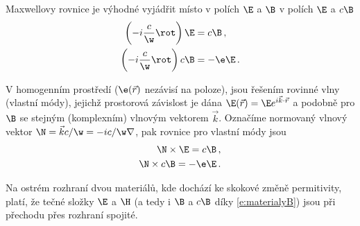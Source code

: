 Maxwellovy rovnice je výhodné vyjádřit místo v polích $\E$ a $\B$ v polích $\E$ a $c\B$
\begin{align}
\left(-i\frac{c}{\w}\rot\right) \E&=c\B \,, \label{e:rotE}\\
\left(-i\frac{c}{\w}\rot\right) c\B&=-\e \E \,. \label{e:rotB}
\end{align}

V homogenním prostředí ($\e(\vec{r})$ nezávisí na poloze), jsou řešením rovinné vlny (vlastní módy), jejichž prostorová závislost je dána $\E(\vec{r})=\E e^{i \vec{k}\cdot\vec{r}}$ a podobně pro $\B$ se stejným (komplexním) vlnovým vektorem $\vec{k}$.
Označíme normovaný vlnový vektor $\N=\vec{k} c/\w=-ic/\w\nabla$, pak rovnice pro vlastní módy jsou
\begin{align}
\N \times \E = c\B \,, \label{e:NE}\\
\N \times c\B = -\e \E \,. \label{e:NB}
\end{align}

Na ostrém rozhraní dvou materiálů, kde dochází ke skokové změně permitivity, platí, že tečné složky $\E$ a $\H$ (a tedy i $\B$ a $c\B$ díky \eqref{e:materialyB}) jsou při přechodu přes rozhraní spojité\cite{Bornwolf}.
